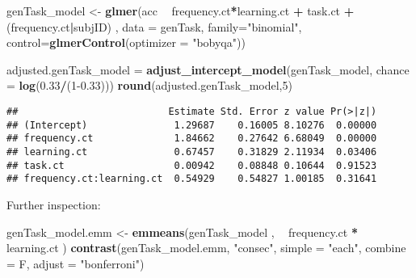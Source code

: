 \documentclass[
]{article}
\newenvironment{Shaded}{\begin{snugshade}}{\end{snugshade}}
\newcommand{\DataTypeTok}[1]{\textcolor[rgb]{0.13,0.29,0.53}{#1}}
\newcommand{\DecValTok}[1]{\textcolor[rgb]{0.00,0.00,0.81}{#1}}
\newcommand{\FloatTok}[1]{\textcolor[rgb]{0.00,0.00,0.81}{#1}}
\newcommand{\KeywordTok}[1]{\textcolor[rgb]{0.13,0.29,0.53}{\textbf{#1}}}
\newcommand{\NormalTok}[1]{#1}
\newcommand{\OperatorTok}[1]{\textcolor[rgb]{0.81,0.36,0.00}{\textbf{#1}}}
\newcommand{\StringTok}[1]{\textcolor[rgb]{0.31,0.60,0.02}{#1}}
\begin{document}
\begin{Shaded}
\begin{Highlighting}[]
\NormalTok{genTask_model <-}\StringTok{ }\KeywordTok{glmer}\NormalTok{(acc }\OperatorTok{~}\StringTok{  }\NormalTok{frequency.ct}\OperatorTok{*}\NormalTok{learning.ct }\OperatorTok{+}\StringTok{ }\NormalTok{task.ct }\OperatorTok{+}\StringTok{ }\NormalTok{(frequency.ct}\OperatorTok{|}\NormalTok{subjID) , }
         \DataTypeTok{data =}\NormalTok{ genTask, }
         \DataTypeTok{family=}\StringTok{"binomial"}\NormalTok{,}
         \DataTypeTok{control=}\KeywordTok{glmerControl}\NormalTok{(}\DataTypeTok{optimizer =} \StringTok{"bobyqa"}\NormalTok{))}

\NormalTok{adjusted.genTask_model =}\StringTok{ }\KeywordTok{adjust_intercept_model}\NormalTok{(genTask_model, }\DataTypeTok{chance =} \KeywordTok{log}\NormalTok{(}\FloatTok{0.33}\OperatorTok{/}\NormalTok{(}\DecValTok{1}\FloatTok{-0.33}\NormalTok{)))}
\KeywordTok{round}\NormalTok{(adjusted.genTask_model,}\DecValTok{5}\NormalTok{)}
\end{Highlighting}
\end{Shaded}

\begin{verbatim}
##                          Estimate Std. Error z value Pr(>|z|)
## (Intercept)               1.29687    0.16005 8.10276  0.00000
## frequency.ct              1.84662    0.27642 6.68049  0.00000
## learning.ct               0.67457    0.31829 2.11934  0.03406
## task.ct                   0.00942    0.08848 0.10644  0.91523
## frequency.ct:learning.ct  0.54929    0.54827 1.00185  0.31641
\end{verbatim}

Further inspection:

\begin{Shaded}
\begin{Highlighting}[]
\NormalTok{genTask_model.emm <-}\StringTok{ }\KeywordTok{emmeans}\NormalTok{(genTask_model , }\OperatorTok{~}\StringTok{ }\NormalTok{frequency.ct }\OperatorTok{*}\StringTok{ }\NormalTok{learning.ct )}
\KeywordTok{contrast}\NormalTok{(genTask_model.emm, }\StringTok{"consec"}\NormalTok{,  }\DataTypeTok{simple =} \StringTok{"each"}\NormalTok{, }\DataTypeTok{combine =}\NormalTok{ F, }\DataTypeTok{adjust =} \StringTok{"bonferroni"}\NormalTok{)}
\end{Highlighting}
\end{Shaded}
\end{document}
